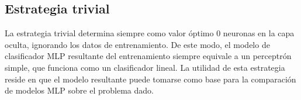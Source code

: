 %
\subsection{Estrategia trivial}
%
La estrategia trivial determina siempre como valor óptimo 0 neuronas
en la capa oculta, ignorando los datos de entrenamiento.
De este modo, el modelo de clasificador MLP resultante del
entrenamiento siempre equivale a un perceptrón simple, que funciona
como un clasificador lineal.
La utilidad de esta estrategia reside en que el modelo resultante
puede tomarse como base para la comparación de modelos MLP sobre el
problema dado.
%
%

